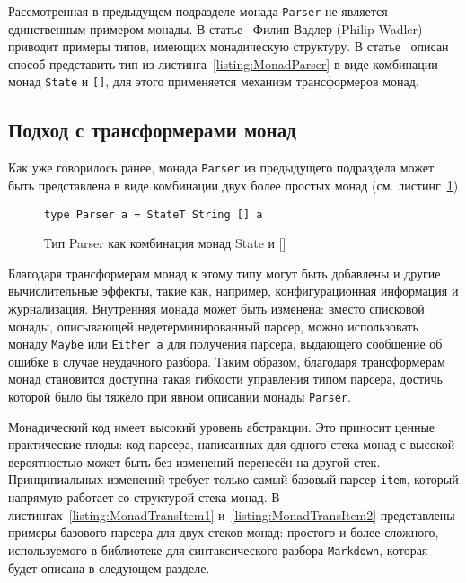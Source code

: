 Рассмотренная в предыдущем подразделе монада \lstinline{Parser} не является
единственным примером монады. В статье~\cite{wadlerMonads} Филип Вадлер
(Philip Wadler) приводит примеры типов, имеющих монадическую структуру.
В статье~\cite{monParsing} описан способ представить тип из
листинга~\ref{listing:MonadParser} в виде комбинации монад \lstinline{State}
и \lstinline{[]}, для этого применяется механизм трансформеров монад.

\subsection{Подход с трансформерами монад}

Как уже говорилось ранее, монада \lstinline{Parser} из предыдущего подраздела 
может быть представлена в виде комбинации двух более простых монад 
(см. листинг~\ref{listing:MonadTransParser})

\begin{figure}[h]
\begin{lstlisting}
type Parser a = StateT String [] a
\end{lstlisting}
\caption{Тип Parser как комбинация монад State и []}
\label{listing:MonadTransParser}
\end{figure}

Благодаря трансформерам монад к этому типу могут быть добавлены и другие 
вычислительные эффекты, такие как, например, конфигурационная информация и 
журнализация. Внутренняя монада может быть изменена: вместо списковой монады, 
описывающей недетерминированный парсер, можно использовать монаду 
\lstinline{Maybe} или \lstinline{Either a} для получения парсера, выдающего 
сообщение об ошибке в случае неудачного разбора. Таким образом, благодаря 
трансформерам монад становится доступна такая гибкости управления типом парсера,
достичь которой было бы тяжело при явном описании монады \lstinline{Parser}.

Монадический код имеет высокий уровень абстракции. Это приносит ценные 
практические плоды: код парсера, написанных для одного стека монад с высокой 
вероятностью может быть без изменений перенесён на другой стек. Принципиальных 
изменений требует только самый базовый парсер \lstinline{item}, который напрямую
работает со структурой стека монад. В листингах~\ref{listing:MonadTransItem1}
и~\ref{listing:MonadTransItem2} представлены примеры базового парсера для двух
стеков монад: простого и более сложного, используемого в библиотеке для
синтаксического разбора \lstinline{Markdown}, которая будет описана в следующем 
разделе.

